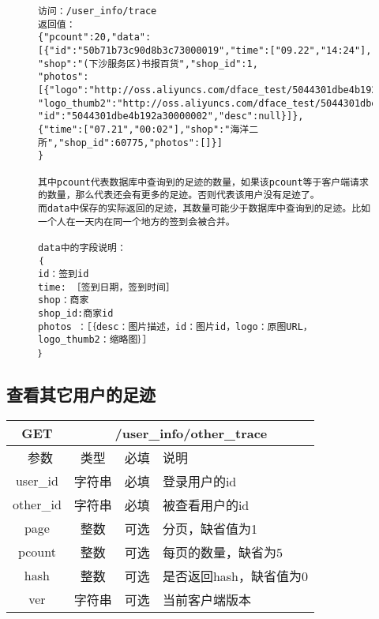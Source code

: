 \documentclass[cs4size]{ctexartutf8}
\begin{document}
\begin{figure}[H]
\begin{verbatim}
访问：/user_info/trace
返回值：
{"pcount":20,"data":
[{"id":"50b71b73c90d8b3c73000019","time":["09.22","14:24"],
"shop":"(下沙服务区)书报百货","shop_id":1,
"photos":[{"logo":"http://oss.aliyuncs.com/dface_test/5044301dbe4b192a30000002/0.jpg",
"logo_thumb2":"http://oss.aliyuncs.com/dface_test/5044301dbe4b192a30000002/t2_0.jpg",
"id":"5044301dbe4b192a30000002","desc":null}]},
{"time":["07.21","00:02"],"shop":"海洋二所","shop_id":60775,"photos":[]}]
}

其中pcount代表数据库中查询到的足迹的数量，如果该pcount等于客户端请求的数量，那么代表还会有更多的足迹。否则代表该用户没有足迹了。
而data中保存的实际返回的足迹，其数量可能少于数据库中查询到的足迹。比如一个人在一天内在同一个地方的签到会被合并。

data中的字段说明：
｛
id：签到id
time: ［签到日期，签到时间］
shop：商家
shop_id:商家id
photos ：［｛desc：图片描述，id：图片id，logo：原图URL，logo_thumb2：缩略图｝］
｝

\end{verbatim}
\end{figure}


\subsection{查看其它用户的足迹}

\begin{table}[H]
   \begin{center}
\begin{tabular}{|c|c|c|p{12cm}|}
\hline
GET & \multicolumn{3}{|c|}{/user\_info/other\_trace} \\
\hline\hline
 \  参数  & 类型 & 必填 &  说明  \\
\hline
 user\_id  & 字符串 & 必填 &  登录用户的id\\ 
\hline
 other\_id  & 字符串 & 必填 &  被查看用户的id\\ 
   \hline
 page  & 整数 & 可选 & 分页，缺省值为1\\ 
 \hline
 pcount  & 整数 & 可选 & 每页的数量，缺省为5\\ 
  \hline
 hash  & 整数 & 可选 & 是否返回hash，缺省值为0\\
  \hline
 ver  & 字符串 & 可选 & 当前客户端版本\\ 
 \hline
\end{tabular}
   \end{center}
\end{table}
\end{document}

